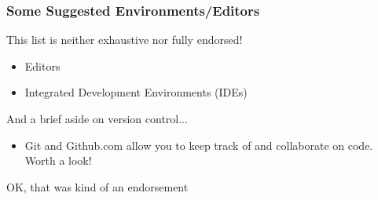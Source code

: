 \documentclass{beamer}
\begin{document}
\begin{frame}[fragile]
\frametitle{Some Suggested Environments/Editors}
This list is neither exhaustive nor fully endorsed!
\begin{itemize}
\item Editors
\item Integrated Development Environments (IDEs)
\end{itemize}
\pause
And a brief aside on version control...
\begin{itemize}
\item Git and Github.com allow you to keep track of and collaborate on code. Worth a look!
\end{itemize}
\pause
\begin{tiny}
OK, that was kind of an endorsement
\end{tiny}
\end{frame}
\end{document}
